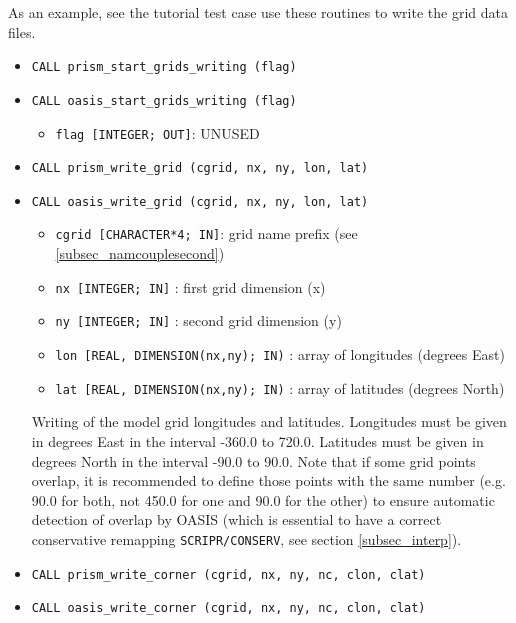 As an example, see the tutorial test case
use these routines to write the grid data
files.


\begin{itemize}
  
\item {\tt CALL  prism\_start\_grids\_writing (flag)}
\item {\tt CALL  oasis\_start\_grids\_writing (flag)}
        
  \begin{itemize}
    \item {\tt flag [INTEGER; OUT]}:  UNUSED
  \end{itemize}

\item {\tt CALL prism\_write\_grid (cgrid, nx, ny, lon, lat)}
\item {\tt CALL oasis\_write\_grid (cgrid, nx, ny, lon, lat)}
        
 \begin{itemize}
    \item {\tt cgrid [CHARACTER*4; IN]}: grid name prefix (see
    \ref{subsec_namcouplesecond})
    \item {\tt nx [INTEGER; IN]} : first grid dimension (x)
    \item {\tt ny [INTEGER; IN]} : second grid dimension (y)
    \item {\tt lon [REAL, DIMENSION(nx,ny); IN)} : array of longitudes
      (degrees East) 
    \item {\tt lat [REAL, DIMENSION(nx,ny); IN)} : array of latitudes
    (degrees North)
 \end{itemize}

 Writing of the model grid longitudes and latitudes. Longitudes must
 be given in degrees East in the interval -360.0 to 720.0. Latitudes
 must be given in degrees North in the interval -90.0 to 90.0. Note
 that if some grid points overlap, it is recommended to define those
 points with the same number (e.g. 90.0 for both, not 450.0 for one
 and 90.0 for the other) to ensure automatic detection of overlap by OASIS
 (which is essential to have a correct conservative remapping
 \texttt{SCRIPR/CONSERV}, see section \ref{subsec_interp}). 


\item {\tt CALL prism\_write\_corner (cgrid, nx, ny, nc, clon, clat)}
\item {\tt CALL oasis\_write\_corner (cgrid, nx, ny, nc, clon, clat)}


\end{itemize}
